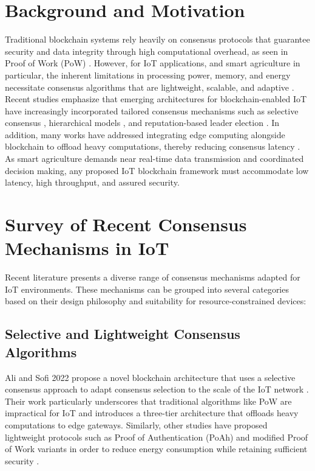 \documentclass[12pt,onecolumn]{IEEEtran} %
\begin{document}
\section{Background and Motivation}
Traditional blockchain systems rely heavily on consensus protocols that guarantee security and data integrity through high computational overhead, as seen in Proof of Work (PoW) \cite{ali2022blockchainenabledarchitecture}. However, for IoT applications, and smart agriculture in particular, the inherent limitations in processing power, memory, and energy necessitate consensus algorithms that are lightweight, scalable, and adaptive \cite{bryant2022keychallengesin, khan2022asurveyand}. Recent studies emphasize that emerging architectures for blockchain-enabled IoT have increasingly incorporated tailored consensus mechanisms such as selective consensus \cite{ali2022blockchainenabledarchitecture}, hierarchical models \cite{guo2022ahierarchicaland}, and reputation-based leader election \cite{morais2023surveyonintegration}. In addition, many works have addressed integrating edge computing alongside blockchain to offload heavy computations, thereby reducing consensus latency \cite{khan2022asurveyand, haque2024ascalableblockchain}. As smart agriculture demands near real-time data transmission and coordinated decision making, any proposed IoT blockchain framework must accommodate low latency, high throughput, and assured security.

\section{Survey of Recent Consensus Mechanisms in IoT}
Recent literature presents a diverse range of consensus mechanisms adapted for IoT environments. These mechanisms can be grouped into several categories based on their design philosophy and suitability for resource-constrained devices:

\subsection{Selective and Lightweight Consensus Algorithms}
Ali and Sofi 2022 propose a novel blockchain architecture that uses a selective consensus approach to adapt consensus selection to the scale of the IoT network \cite{ali2022blockchainenabledarchitecture}. Their work particularly underscores that traditional algorithms like PoW are impractical for IoT and introduces a three-tier architecture that offloads heavy computations to edge gateways. Similarly, other studies have proposed lightweight protocols such as Proof of Authentication (PoAh) and modified Proof of Work variants in order to reduce energy consumption while retaining sufficient security \cite{haque2024ascalableblockchain, khan2022asurveyand}.
\end{document}

